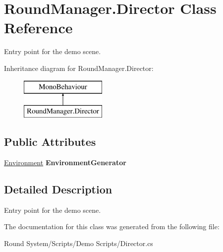 \hypertarget{class_round_manager_1_1_director}{}\section{Round\+Manager.\+Director Class Reference}
\label{class_round_manager_1_1_director}


Entry point for the demo scene.  


Inheritance diagram for Round\+Manager.\+Director\+:\begin{figure}[H]
\begin{center}
\leavevmode
\includegraphics[height=2.000000cm]{class_round_manager_1_1_director}
\end{center}
\end{figure}
\subsection*{Public Attributes}
\begin{DoxyCompactItemize}
\item 
\hypertarget{class_round_manager_1_1_director_aa90ec85d651bf7772751df0eaff5de98}{}\hyperlink{class_round_manager_1_1_environment}{Environment} {\bfseries Environment\+Generator}\label{class_round_manager_1_1_director_aa90ec85d651bf7772751df0eaff5de98}

\end{DoxyCompactItemize}


\subsection{Detailed Description}
Entry point for the demo scene. 



The documentation for this class was generated from the following file\+:\begin{DoxyCompactItemize}
\item 
Round System/\+Scripts/\+Demo Scripts/Director.\+cs\end{DoxyCompactItemize}

